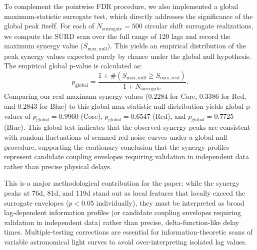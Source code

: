 \documentclass[12pt, a4paper]{article}
\begin{document}
To complement the pointwise FDR procedure, we also implemented a global maximum-statistic surrogate test, which directly addresses the significance of the global peak itself. For each of $N_{\mathrm{surrogate}} = 500$ circular shift surrogate realizations, we compute the SURD scan over the full range of 120 lags and record the maximum synergy value ($S_{\mathrm{max, null}}$). This yields an empirical distribution of the peak synergy values expected purely by chance under the global null hypothesis. The empirical global p-value is calculated as:
\begin{equation}
p_{\mathrm{global}} = \frac{1 + \#(S_{\mathrm{max, null}} \ge S_{\mathrm{max, real}})}{1 + N_{\mathrm{surrogate}}}.
\end{equation}
Comparing our real maximum synergy values ($0.2284$ for Core, $0.3386$ for Red, and $0.2843$ for Blue) to this global max-statistic null distribution yields global p-values of $p_{\mathrm{global}} = 0.9960$ (Core), $p_{\mathrm{global}} = 0.6547$ (Red), and $p_{\mathrm{global}} = 0.7725$ (Blue). This global test indicates that the observed synergy peaks are consistent with random fluctuations of scanned red-noise curves under a global null procedure, supporting the cautionary conclusion that the synergy profiles represent candidate coupling envelopes requiring validation in independent data rather than precise physical delays.

This is a major methodological contribution for the paper: while the synergy peaks at 76d, 81d, and 119d stand out as local features that locally exceed the surrogate envelopes ($p < 0.05$ individually), they must be interpreted as broad lag-dependent information profiles (or candidate coupling envelopes requiring validation in independent data) rather than precise, delta-function-like delay times. Multiple-testing corrections are essential for information-theoretic scans of variable astronomical light curves to avoid over-interpreting isolated lag values.
\end{document}
